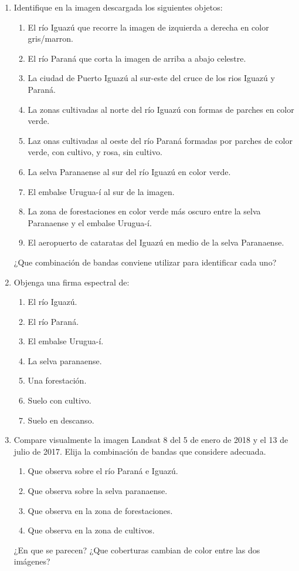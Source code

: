 \begin{enumerate}
  \item Identifique en la imagen descargada los siguientes objetos:
  \begin{enumerate}
    \item El río Iguazú que recorre la imagen de izquierda a derecha en color gris/marron.
    \item El río Paraná que corta la imagen de arriba a abajo celestre.
    \item La ciudad de Puerto Iguazú al sur-este del cruce de los rios Iguazú y Paraná.
    \item La zonas cultivadas al norte del río Iguazú con formas de parches en color verde.
    \item Laz onas cultivadas al oeste del río Paraná formadas por parches de color verde, con cultivo, y rosa, sin cultivo.
    \item La selva Paranaense al sur del río Iguazú en color verde.
    \item El embalse Urugua-í al sur de la imagen.
    \item La zona de forestaciones en color verde más oscuro entre la selva Paranaense y el embalse Urugua-í.
    \item El aeropuerto de cataratas del Iguazú en medio de la selva Paranaense.
  \end{enumerate}
  ¿Que combinación de bandas conviene utilizar para identificar cada uno?

  \item Objenga una firma espectral de:
  \begin{enumerate}
    \item El río Iguazú.
    \item El río Paraná.
    \item El embalse Urugua-í.
    \item La selva paranaense.
    \item Una forestación.
    \item Suelo con cultivo.
    \item Suelo en descanso.
  \end{enumerate}

  \item Compare visualmente la imagen Landsat 8 del 5 de enero de 2018 y el 13 de julio de 2017. Elija la combinación de bandas que considere adecuada.
  \begin{enumerate}
    \item Que observa sobre el río Paraná e Iguazú.
    \item Que observa sobre la selva paranaense.
    \item Que observa en la zona de forestaciones.
    \item Que observa en la zona de cultivos.
  \end{enumerate}
  ¿En que se parecen? ¿Que coberturas cambian de color entre las dos imágenes?


\end{enumerate}
